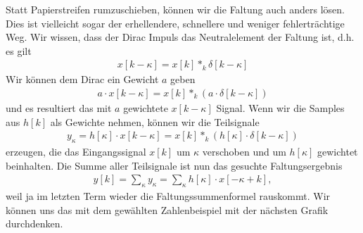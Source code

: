 \noindent Statt Papierstreifen rumzuschieben, können wir die Faltung auch anders lösen.
%
Dies ist vielleicht sogar der erhellendere, schnellere und weniger fehlerträchtige Weg.
%
Wir wissen, dass der Dirac Impuls das Neutralelement der Faltung ist, d.h. es gilt
\begin{align}
x[k - \kappa] = x[k] \ast_k \delta[k-\kappa]
\end{align}
Wir können dem Dirac ein Gewicht $a$ geben
\begin{align}
a \cdot x[k - \kappa] = x[k] \ast_k (a \cdot \delta[k-\kappa])
\end{align}
und es resultiert das mit $a$ gewichtete $x[k - \kappa]$ Signal.
%
Wenn wir die Samples aus $h[k]$ als Gewichte nehmen, können wir die Teilsignale
\begin{align}
y_\kappa = h[\kappa] \cdot x[k - \kappa] = x[k] \ast_k (h[\kappa] \cdot \delta[k-\kappa])
\end{align}
erzeugen, die das Eingangssignal $x[k]$ um $\kappa$ verschoben und um $h[\kappa]$ gewichtet beinhalten.
%
Die Summe aller Teilsignale ist nun das gesuchte Faltungsergebnis
\begin{align}
\label{eq:LinKombDiskFaltung}
y[k] = \sum\limits_{\kappa} y_\kappa = \sum\limits_{\kappa} h[\kappa] \cdot x[-\kappa + k],
\end{align}
weil ja im letzten Term wieder die Faltungssummenformel rauskommt.
%
Wir können uns das mit dem gewählten Zahlenbeispiel mit der nächsten Grafik durchdenken.

\newpage
\begin{center}
\end{center}


